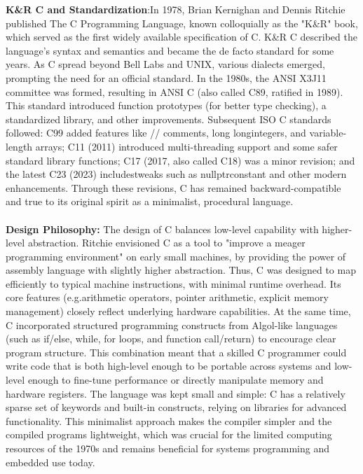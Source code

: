 \documentclass{article}
\begin{document}
{\normalsize \textbf{K\&R C and Standardization}}{\normalsize :}{\normalsize  In 1978, Brian Kernighan and Dennis Ritchie published The C Programming Language, known colloquially as the "K\&R" book, which served as the first wide}{\normalsize ly available specification of C. K\&R C described the language's syntax and semantics and became the de facto standard for some years. As C spread beyond Bell Labs and UNIX, various dialects emerged, prompting the need for an official standard. In the 1980s}{\normalsize , the ANSI X3J11 committee was formed, resulting in ANSI C (also called C89, ratified in 1989). This standard introduced function prototypes (for better type checking), a standardized library, and other improvements. Subsequent ISO C standards followed: C9}{\normalsize 9 added features like // comments, long }{\normalsize long}{\normalsize  integers, and variable-length arrays; C11 (2011) introduced multi-threading support and some safer standard library functions; C17 (2017, also called C18) was a minor revision; and the latest C23 (2023) includes}{\normalsize  tweaks such as }{\normalsize nullptr}{\normalsize  constant }{\normalsize and other modern enhancements. Through these revisions, C has remained backward-compatible and true to its original spirit as a minimalist, procedural language.}\\
\\
{\normalsize \textbf{Design Philosophy}}{\normalsize \textbf{:}} {\normalsize The design of C balances low-level capabi}{\normalsize lity with higher-level abstraction. Ritchie envisioned C as a tool to "improve a meager programming environment" on early small machines, by providing the power of assembly language with slightly higher abstraction. Thus, C was designed to map efficiently }{\normalsize to typical machine instructions, with minimal runtime overhead. Its core features (}{\normalsize e.g.}{\normalsize  arithmetic operators, pointer arithmetic, explicit memory management) closely reflect underlying hardware capabilities. At the same time, C incorporated structured prog}{\normalsize ramming constructs from Algol-like languages (such as if/else, while, for loops, and function call/return) to encourage clear program structure. This combination meant that a skilled C programmer could write code that is both high-level enough to be portab}{\normalsize le across systems and low-level enough to fine-tune performance or directly manipulate memory and hardware registers. The language was kept small and simple: C has a relatively sparse set of keywords and built-in constructs, relying on libraries for advanc}{\normalsize ed functionality. This minimalist approach makes the compiler simpler and the compiled programs lightweight, which was crucial for the limited computing resources of the 1970s and remains beneficial for systems programming and embedded use today.}\\
\end{document}
